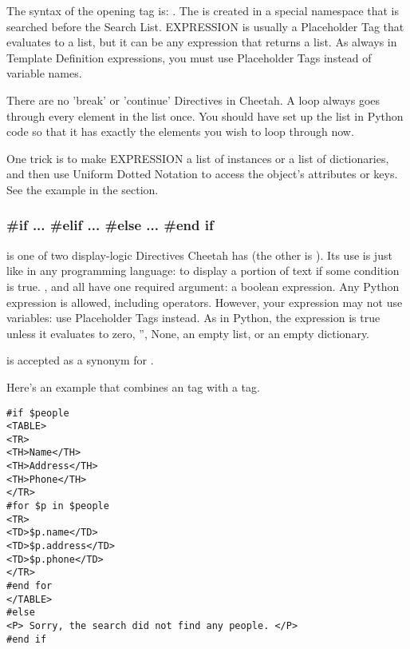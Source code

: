 {The syntax of the opening tag is: .  The  is created in a special namespace
that is searched before the Search List.  EXPRESSION is usually a 
Placeholder Tag that evaluates to a list, but it can be any expression that
returns a list.  As always in Template Definition expressions, you must use
Placeholder Tags instead of variable names.

There are no 'break' or 'continue' Directives in Cheetah.  A  loop
always goes through every element in the list once.  You should have set up the
list in Python code so that it has exactly the elements you wish to loop through
now.

One trick is to make EXPRESSION a list of instances or a list of dictionaries,
and then use Uniform Dotted Notation to access the object's attributes or keys.
See the example in the  section.

\subsubsection{\#if ... \#elif ... \#else ... \#end if}

 is one of two display-logic Directives Cheetah has (the other is
).  Its use is just like in any programming language: to display
a portion of text if some condition is true.  
,  and  all have one required argument:
a boolean expression.  Any Python expression is allowed, including operators.
However, your expression may not use variables:  use Placeholder Tags instead.
As in Python, the expression is true unless it evaluates to zero, '', None, an
empty list, or an empty dictionary.

 is accepted as a synonym for {\elif}.

Here's an example that combines an  tag with a  tag.

\begin{verbatim}
#if $people
<TABLE>
<TR>
<TH>Name</TH>
<TH>Address</TH>
<TH>Phone</TH>
</TR>
#for $p in $people
<TR>
<TD>$p.name</TD>
<TD>$p.address</TD>
<TD>$p.phone</TD>
</TR>
#end for
</TABLE>
#else
<P> Sorry, the search did not find any people. </P>
#end if
\end{verbatim}



}
